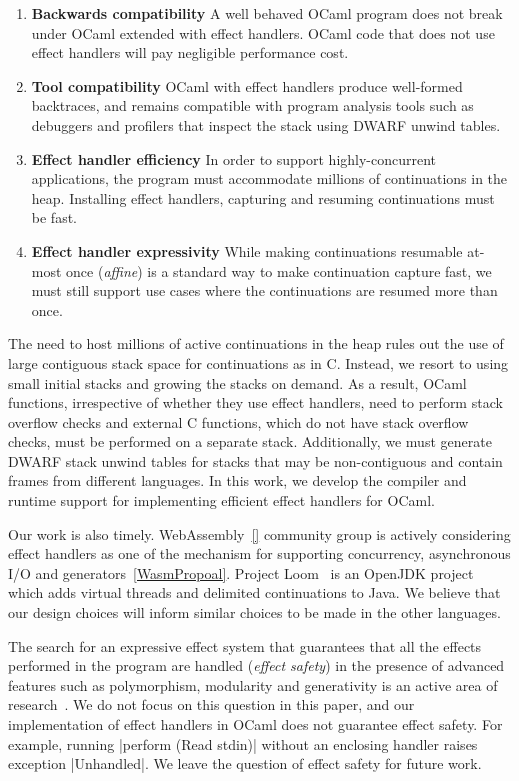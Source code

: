 \documentclass[sigplan,10pt,review,anonymous]{acmart}\settopmatter{printfolios=true,printccs=false,printacmref=false}
\begin{document}
\begin{enumerate}[label=R\arabic*]
	\item \textbf{Backwards compatibility} A well behaved OCaml program does not
		break under OCaml extended with effect handlers. OCaml code that does not
		use effect handlers will pay negligible performance cost.
	\item \textbf{Tool compatibility} OCaml with effect handlers produce
		well-formed backtraces, and remains compatible with program analysis tools
		such as debuggers and profilers that inspect the stack using DWARF unwind
		tables.
	\item \textbf{Effect handler efficiency} In order to support
		highly-concurrent applications, the program must accommodate millions of
		continuations in the heap. Installing effect handlers, capturing and
		resuming continuations must be fast.
	\item \textbf{Effect handler expressivity} While making continuations
		resumable at-most once (\emph{affine}) is a standard way to make
		continuation capture fast, we must still support use cases where the
		continuations are resumed more than once.
\end{enumerate}

The need to host millions of active continuations in the heap rules out the use
of large contiguous stack space for continuations as in C. Instead, we resort
to using small initial stacks and growing the stacks on demand. As a result,
OCaml functions, irrespective of whether they use effect handlers, need to
perform stack overflow checks and external C functions, which do not have stack
overflow checks, must be performed on a separate stack. Additionally, we must
generate DWARF stack unwind tables for stacks that may be non-contiguous and
contain frames from different languages. In this work, we develop the compiler
and runtime support for implementing efficient effect handlers for OCaml.

Our work is also timely. WebAssembly~\ref{} community group is actively
considering effect handlers as one of the mechanism for supporting concurrency,
asynchronous I/O and generators~\ref{WasmPropoal}. Project Loom~\cite{} is an
OpenJDK project which adds virtual threads and delimited continuations to Java.
We believe that our design choices will inform similar choices to be made in
the other languages.

The search for an expressive effect system that guarantees that all the effects
performed in the program are handled (\emph{effect safety}) in the presence of
advanced features such as polymorphism, modularity and generativity is an
active area of research~\cite{Leijen14, Biernacki19, Biernacki20,
Hillerstrom20}. We do not focus on this question in this paper, and our
implementation of effect handlers in OCaml does not guarantee effect safety.
For example, running |perform (Read stdin)| without an enclosing handler raises
exception |Unhandled|. We leave the question of effect safety for future work.
\end{document}
